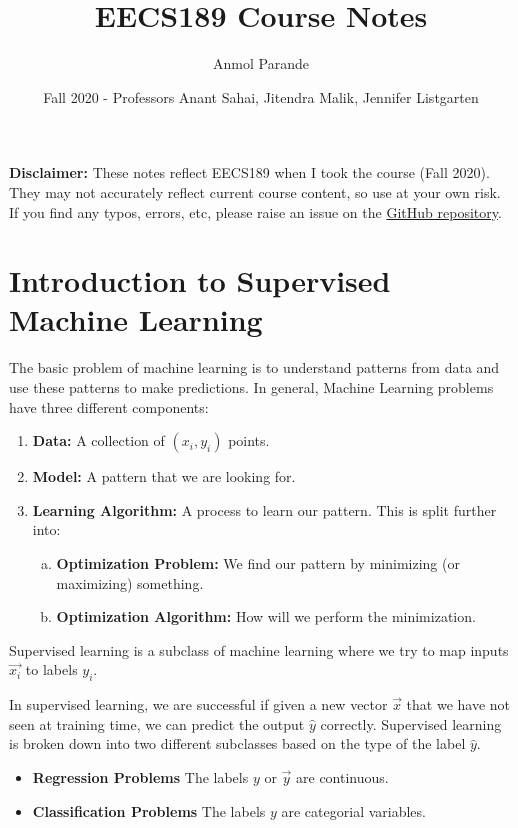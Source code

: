 

\title{EECS189 Course Notes}
\author{Anmol Parande}
\date{Fall 2020 - Professors Anant Sahai, Jitendra Malik, Jennifer Listgarten}
\maketitle
\textbf{Disclaimer: }These notes reflect EECS189 when I took the course (Fall 2020). They may not accurately reflect current course content, so use at your own risk.
If you find any typos, errors, etc, please raise an issue on the \href{https://github.com/aparande/BerkeleyNotes}{GitHub repository}.\\
\tableofcontents
\newpage
\section{Introduction to Supervised Machine Learning}
The basic problem of machine learning is to understand patterns from data and use these patterns to make predictions.
In general, Machine Learning problems have three different components:
\begin{enumerate}
  \item \textbf{Data:} A collection of $(x_i, y_i)$ points.
  \item \textbf{Model:} A pattern that we are looking for.
  \item \textbf{Learning Algorithm:} A process to learn our pattern. This is split further into:
    \begin{enumerate}[(a)]
      \item \textbf{Optimization Problem:} We find our pattern by minimizing (or maximizing) something.
      \item \textbf{Optimization Algorithm:} How will we perform the minimization.
    \end{enumerate}
\end{enumerate}
\begin{definition}
  Supervised learning is a subclass of machine learning where we try to map inputs $\vec{x_i}$ to labels $y_i$.
  \label{defn:supervised-learning}
\end{definition}
In supervised learning, we are successful if given a new vector $\vec{x}$ that we have not seen at training time, we can predict the output $\hat{y}$ correctly.
Supervised learning is broken down into two different subclasses based on the type of the label $\hat{y}$.
\begin{itemize}
  \item \textbf{Regression Problems} The labels $y$ or $\vec{y}$ are continuous.
  \item \textbf{Classification Problems} The labels $y$ are categorial variables.
\end{itemize}
